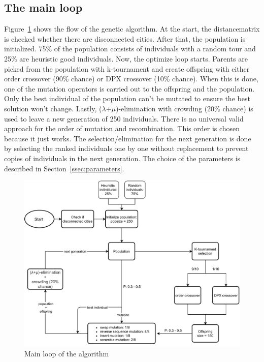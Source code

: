 \documentclass[a4paper,10pt]{article}
\begin{document}
\subsection{The main loop}\label{ssec:mainloop}

Figure~\ref{fig:codeflow} shows the flow of the genetic algorithm. At the start, the distancematrix is checked whether there are disconnected cities. After that, the population is initialized. 75\% of the population consists of individuals with a random tour and 25\% are heuristic good individuals. Now, the optimize loop starts. Parents are picked from the population with k-tournament and create offspring with either order crossover (90\% chance) or DPX crossover (10\% chance). When this is done, one of the mutation operators is carried out to the offspring and the population. Only the best individual of the population can't be mutated to ensure the best solution won't change. Lastly, ($\lambda$+$\mu$)-elimination with crowding (20\% chance) is used to leave a new generation of 250 individuals. 
There is no universal valid approach for the order of mutation and recombination. This order is chosen because it just works. The selection/elimination for the next generation is done by selecting the ranked individuals one by one without replacement to prevent copies of individuals in the next generation.
The choice of the parameters is described in Section~\ref{ssec:parameters}.

\begin{figure}[H]
  \centering
  \includegraphics[width=\linewidth]{img/codeflow.pdf}
  \caption{Main loop of the algorithm}
  \label{fig:codeflow}
\end{figure}
\end{document}
